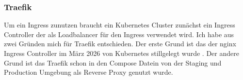 \subsubsection{Traefik}

Um ein Ingress zunutzen braucht ein Kubernetes Cluster zunächst ein Ingress Controller der als Loadbalancer für den Ingress verwendet wird.
Ich habe aus zwei Gründen mich für Traefik entschieden. Der erste Grund ist das der nginx Ingress Controller im März 2026 von Kubernetes stillgelegt wurde \parencite{kubernetes_ingress_nginx_retirement_2025}.
Der andere Grund ist das Traefik schon in den Compose Datein von der Staging und Production Umgebung als Reverse Proxy genutzt wurde.